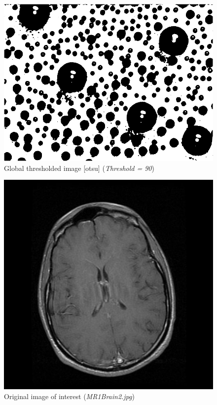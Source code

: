 \documentclass[letterpaper, 12 pt, conference ,onecolumn]{ieeeconf}  %
\begin{document}
\begin{figure}[h!]
\includegraphics[width=0.4\paperwidth]{otsu-thresholding/global/Beads-global-otsu.jpg}
\centering
\caption{Global thresholded image [otsu]  (\textit{Threshold = 90}) }
\label{fig:Beads-global-threshold-otsu}
\end{figure}


\begin{figure}[h!]
\centering
\includegraphics[width=0.4\paperwidth]{optimal-thresholding/global/MRI-original-image.jpg}
\caption{Original image of interest (\textit{MR1Brain2.jpg}) }
\label{fig:MRI-original-image}
\end{figure}
\end{document}
